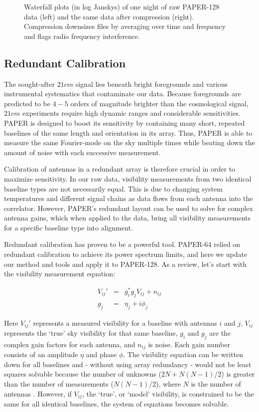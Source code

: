\documentclass[preprint2,numberedappendix,tighten,twocolappendix]{aastex6}  %
\begin{document}
\begin{figure}[!]
	\centering
	\caption{Waterfall plots (in log Janskys) of one night of raw PAPER-128 data (left) and the same data after compression (right). Compression downsizes files by averaging over time and frequency and flags radio frequency interference.}
	\label{fig:raw}
\end{figure}

\subsection{Redundant Calibration}

The sought-after $21 cm$ signal lies beneath bright foregrounds and various instrumental systematics that contaminate our data. Because foregrounds are predicted to be $4-5$ orders of magnitude brighter than the cosmological signal, $21 cm$ experiments require high dynamic ranges and considerable sensitivities. PAPER is designed to boost its sensitivity by containing many short, repeated baselines of the same length and orientation in its array. Thus, PAPER is able to measure the same Fourier-mode on the sky multiple times while beating down the amount of noise with each successive measurement.

Calibration of antennas in a redundant array is therefore crucial in order to maximize sensitivity. In our raw data, visibility measurements from two identical baseline types are not necessarily equal. This is due to changing system temperatures and different signal chains as data flows from each antenna into the correlator. However, PAPER's redundant layout can be used to solve for complex antenna gains, which when applied to the data, bring all visibility measurements for a specific baseline type into alignment. 

Redundant calibration has proven to be a powerful tool. PAPER-64 relied on redundant calibration to achieve its power spectrum limits, and here we update our method and tools and apply it to PAPER-128. As a review, let's start with the visibility measurement equation:

\begin{eqnarray}
\label{viseq}
V_{ij}' &=& g_{i}^{*}g_{j}V_{ij} + n_{ij} \\
g_{j} &=&\eta_{j} + i\phi_{j}
\end{eqnarray}

Here $V_{ij}'$ represents a measured visibility for a baseline with antennas $i$ and $j$, $V_{ij}$ represents the `true' sky visibility for that same baseline, $g_{i}$ and $g_{j}$ are the complex gain factors for each antenna, and $n_{ij}$ is noise. Each gain number consists of an amplitude $\eta$ and phase $\phi$. The visibility equation can be written down for all baselines and - without using array redundancy - would not be least squares solvable because the number of unknowns ($2N+N(N-1)/2$) is greater than the number of measurements ($N(N-1)/2$), where $N$ is the number of antennas . However, if $V_{ij}$, the `true', or `model' visibility, is constrained to be the same for all identical baselines, the system of equations becomes solvable.
\end{document}
